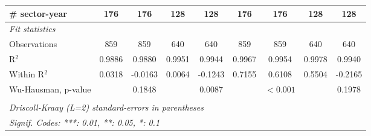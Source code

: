\documentclass[a4paper]{article}
\begin{document}
\begin{table}[h!]
{\begin{tabular}{lcccccccc}
      \# sector-year                                 & 176            & 176           & 128           & 128                    & 176            & 176                   & 128            & 128\\ 
            \midrule
      \emph{Fit statistics}\\
      Observations                                   & 859            & 859           & 640           & 640                    & 859            & 859                   & 640            & 640\\  
      R$^2$                                          & 0.9886         & 0.9880        & 0.9951        & 0.9944                 & 0.9967         & 0.9954                & 0.9978         & 0.9940\\  
      Within R$^2$                                   & 0.0318         & -0.0163       & 0.0064        & -0.1243                & 0.7155         & 0.6108                & 0.5504         & -0.2165\\  
      Wu-Hausman, p-value                            &                & 0.1848        &               & 0.0087                 &                & $<0.001$  &                & 0.1978\\ 
      \bottomrule \\ [-0.9em]
      \multicolumn{9}{l}{\emph{Driscoll-Kraay (L=2) standard-errors in parentheses}}\\
      \multicolumn{9}{l}{\emph{Signif. Codes: ***: 0.01, **: 0.05, *: 0.1}}\\
   \end{tabular}
   }
\end{table}
\FloatBarrier


%
%
\end{document}
